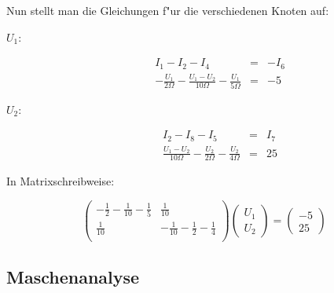 \documentclass[german, 10pt, a4paper, headsepline]{scrreprt}
\theoremstyle{remark}
\begin{document}
Nun stellt man die Gleichungen f"ur die verschiedenen Knoten auf:

\begin{description}
	\item[$U_1$:]
	\begin{eqnarray}
		I_1 - I_2 - I_4 &								= &	-I_6 \nonumber\\
		-\frac{U_1}{2\Omega} - \frac{U_1-U_2}{10\Omega} - \frac{U_1}{5\Omega} &		= &	-5 \nonumber
	\end{eqnarray}
	\item[$U_2$:]
	\begin{eqnarray}
		I_2 - I_8 - I_5 &								= &	I_7 \nonumber\\
		\frac{U_1-U_2}{10\Omega} - \frac{U_2}{2\Omega} - \frac{U_2}{4\Omega} &		= &	25 \nonumber
	\end{eqnarray}
\end{description}

In Matrixschreibweise:

\begin{displaymath}
	\left (
		\begin{array}{cc}
			-\frac{1}{2} - \frac{1}{10} - \frac{1}{5} &		\frac{1}{10}\\
			\frac{1}{10} &						-\frac{1}{10} - \frac{1}{2} - \frac{1}{4}\\
		\end{array}
	\right ) 
	\left (
		\begin{array}{c}
			U_1\\
			U_2
		\end{array}
	\right ) =
	\left (
		\begin{array}{c}
			-5\\
			25
		\end{array}
	\right )
\end{displaymath}

\subsection{Maschenanalyse}
\end{document}
